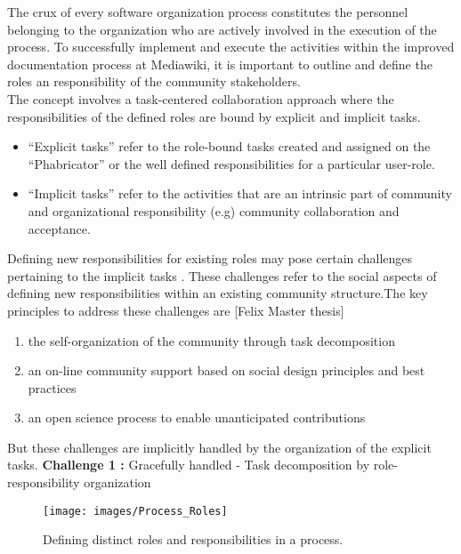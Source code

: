 \indent The crux of every software organization process constitutes the personnel belonging to the organization who are actively involved in the execution of the process. To successfully implement and execute the activities within the improved documentation process at Mediawiki, it is important to outline and define the roles an responsibility of the community stakeholders. 
\\\indent The concept involves a task-centered collaboration approach where the responsibilities of the defined roles are bound by explicit and implicit tasks. 
\begin{itemize}
\item \enquote{Explicit tasks} refer to the role-bound tasks created and assigned on the \enquote{Phabricator} or the well defined responsibilities for a particular user-role.
\item \enquote{Implicit tasks} refer to the activities that are an intrinsic part of community and organizational responsibility (e.g) community collaboration and acceptance.
\end{itemize}
Defining new responsibilities for existing roles may pose certain challenges pertaining to the implicit tasks . These challenges refer to the social aspects of defining new responsibilities within an existing community structure.The key principles to address these challenges are [Felix Master thesis]
\begin{enumerate}
\item the self-organization of the community through task decomposition
\item an on-line community support based on social design principles and best practices
\item an open science process to enable unanticipated contributions
\end{enumerate}

But these challenges are implicitly handled by the organization of the explicit tasks. 
\newline
\indent \textbf{Challenge 1 : }  Gracefully handled - Task decomposition by role-responsibility organization
\begin{figure}[H]
  \centering
  \texttt{[image: images/Process\_Roles]}
  \caption[Defining distinct roles and responsibilities in a process]{Defining distinct roles and responsibilities in a process.}\label{fig:Process_Roles}
\end{figure}

